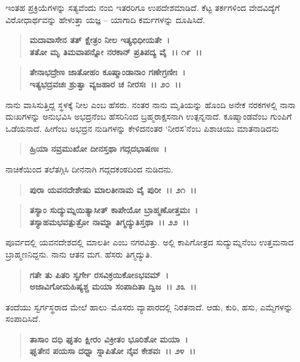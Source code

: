 ಇಂತಹ ಪ್ರಕ್ರಿಯೆಗಳನ್ನು ಸತ್ಯವೆಂದು ನಂಬಿ ಇತರರಿಗೂ ಉಪದೇಶಮಾಡಿದೆ. ಕೆಟ್ಟ ತರ್ಕಗಳಿಂದ ವೇದವಿದ್ಯೆಗೆ ವಿರೋಧಾರ್ಥವನ್ನು ಹೇಳುತ್ತಾ ಯಜ್ಞ – ಯಾಗಾದಿ ಕರ್ಮಗಳನ್ನು ದೂಷಿಸಿದೆ.

\begin{verse}
\textbf{ಮದಾವಾಸೇನ ತತ್ ಕ್ಷೇತ್ರಂ ನೀಲ ಇತ್ಯಭಿಧೀಯತೇ~।}\\\textbf{ತತೋ ಮೃ ತಿಮವಾಪನ್ನೋ ನರಕಾನ್ ಪ್ರತಿಪದ್ಯ ವೈ~।। ೧೯~।। }
\end{verse}

\begin{verse}
\textbf{ತೇನಾಭದ್ರೇಣ ಜಾತೋಹಂ ಕೂಷ್ಮಾಂಡಾನಾಂ ಗಣೇಗ್ರಣೀಃ~।}\\\textbf{ಇತ್ಯಭದ್ರವಚಃ ಶ್ರುತ್ವಾ ವ್ಯಜಹಾರ ಚ ನೀರಸಃ~।। ೨೦~।।}
\end{verse}

ನಾನು ವಾಸಿಸುತ್ತಿದ್ದ ಸ್ಥಳಕ್ಕೆ ನೀಲ ಎಂಬ ಹೆಸರು. ನಂತರ ನಾನು ಮೃತಿಯನ್ನು ಹೊಂದಿ ಅನೇಕ ನರಕಗಳಲ್ಲಿ ನಾನಾ ದುಃಖಗಳನ್ನು ಅನುಭವಿಸಿ ಅಭದ್ರನೆಂಬ ಹೆಸರಿನಿಂದ ಬ್ರಹ್ಮರಾಕ್ಷಸನಾಗಿ ಉತ್ಪನ್ನನಾದೆ. ಕೂಷ್ಮಾಂಡವೆಂಬ ಗುಂಪಿಗೆ ಒಡೆಯನಾದೆ. ಹೀಗೆಂಬ ಅಭದ್ರನ ನುಡಿಗಳನ್ನು ಕೇಳಿದನಂತರ `ನೀರಸ'ನೆಂಬ ಪಿಶಾಚಿಯು ಮಾತನಾಡಿದನು

\begin{verse}
\textbf{ಹ್ರಿಯಾ ನವ್ರಮುಖೋ ದೀನಸ್ತಥಾ ಗದ್ಗದಭಾಷಣಃ~।}
\end{verse}

ನಾಚಿಕೆಯಿಂದ ತಲೆತಗ್ಗಿಸಿ ದೀನನಾಗಿ ಗದ್ಗದಕಂಠದಿಂದ ನುಡಿದನು.

\begin{verse}
\textbf{ಪುರಾ ಯವನದೇಶೇಷು ಮಾಲತೀನಾಮ ವೈ ಪುರೀ~।। ೨೧~।। }
\end{verse}

\begin{verse}
\textbf{ತಸ್ಯಾಂ ಸುದ್ಯುಮ್ನಯಿತ್ಯಾಸೀತ್ ಕಾಪೇಯೋ ಬ್ರಾಹ್ಮಣೋತ್ತಮಃ~।}\\\textbf{ತಸ್ಯಾಹಮಭವತ್ಪುತ್ರೋ ನಾಮ್ನಾ ತಿಗ್ಮದ್ಯುತಿಸ್ತಥಾ~।। ೨೨~।।}
\end{verse}

ಪೂರ್ವದಲ್ಲಿ ಯವನದೇಶದಲ್ಲಿ ಮಾಲತೀ ಎಂಬ ನಗರವಿತ್ತು. ಅಲ್ಲಿ ಕಾಪಿಗೋತ್ರದ ಸುದ್ಯುಮ್ನನೆಂಬ ಉತ್ತಮನಾದ ಬ್ರಾಹ್ಮಣನಿದ್ದನು. ನಾನು ಆತನ ಮಗ. ಹೆಸರು ತಿಗ್ಮದ್ಯುತಿ.

\begin{verse}
\textbf{ಗತೇ ತು ಪಿತರಿ ಸ್ವರ್ಗೇ ರಸವಿಕ್ರಯಿಕೋಽಭವಮ್~।}\\\textbf{ಅಜಾವಿಗೋಮಹಿಷ್ಯಶ್ಚ ಮಯಾ ಸಂಪಾದಿತಾ ದ್ವಿಜ~।। ೨೩~।।}
\end{verse}

ತಂದೆಯು ಸ್ವರ್ಗಸ್ಥರಾದ ಮೇಲೆ ಹಾಲು–ಮೊಸರು ವ್ಯಾಪಾರದಲ್ಲಿ ನಿರತನಾದೆ. ಆಡು, ಕುರಿ, ಹಸು, ಎಮ್ಮೆಗಳನ್ನು ಸಂಪಾದಿಸಿದೆ.

\begin{verse}
\textbf{ತಾಸಾಂ ದಧಿ ಘೃತಂ ಕ್ಷೀರಂ ವಿಕ್ರೀತಂ ಭೂರಿಶೋ ಮಯಾ~।}\\\textbf{ಘೃತೇನ ಪಯಸಾ ದಧ್ನಾ ಸ್ನಾಪಿತೋ ನೈವ ಕೇಶವಃ~।। ೨೪~।।}
\end{verse}


